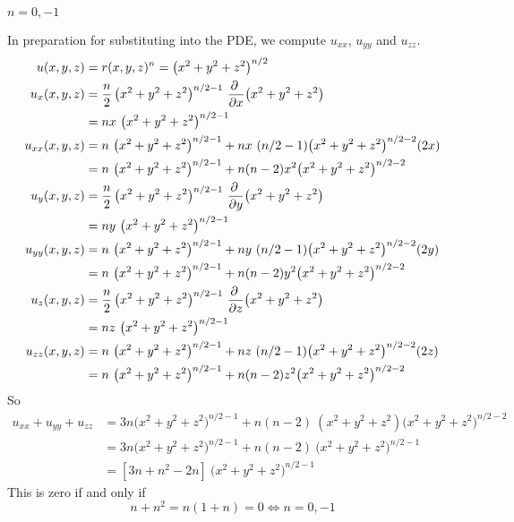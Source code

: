 %

\begin{answer}
$n=0, -1$
\end{answer}

\begin{solution}
In preparation for substituting into the PDE, we compute $u_{xx}$, $u_{yy}$ and $u_{zz}$.   
\begin{align*}
u(x,y,z) &= r(x,y,z)^n = \big(x^2+y^2+z^2\big)^{n/2}
\\
u_x(x,y,z)&= \frac{n}{2}\,\big(x^2+y^2+z^2\big)^{n/2-1}\ 
                             \pdiff{}{x}\big(x^2+y^2+z^2\big) \\
              &= nx\ \big(x^2+y^2+z^2\big)^{n/2-1}
\\
u_{xx}(x,y,z)&= n\ \big(x^2+y^2+z^2\big)^{n/2-1}
              + nx\ (n/2-1) \big(x^2+y^2+z^2\big)^{n/2-2} (2x) \\
             &=n\ \big(x^2+y^2+z^2\big)^{n/2-1}
              +n(n-2)x^2 \big(x^2+y^2+z^2\big)^{n/2-2} 
\\
u_y(x,y,z)&= \frac{n}{2}\,\big(x^2+y^2+z^2\big)^{n/2-1}\ 
                             \pdiff{}{y}\big(x^2+y^2+z^2\big) \\
              &= ny\ \big(x^2+y^2+z^2\big)^{n/2-1}
\\
u_{yy}(x,y,z)&= n\ \big(x^2+y^2+z^2\big)^{n/2-1}
              + ny\ (n/2-1) \big(x^2+y^2+z^2\big)^{n/2-2} (2y) \\
             &=n\ \big(x^2+y^2+z^2\big)^{n/2-1}
              +n(n-2)y^2 \big(x^2+y^2+z^2\big)^{n/2-2} 
\\
u_z(x,y,z)&= \frac{n}{2}\,\big(x^2+y^2+z^2\big)^{n/2-1}\ 
                             \pdiff{}{z}\big(x^2+y^2+z^2\big) \\
              &= nz\ \big(x^2+y^2+z^2\big)^{n/2-1}
\\
u_{zz}(x,y,z)&= n\ \big(x^2+y^2+z^2\big)^{n/2-1}
              + nz\ (n/2-1) \big(x^2+y^2+z^2\big)^{n/2-2} (2z) \\
             &=n\ \big(x^2+y^2+z^2\big)^{n/2-1}
              +n(n-2)z^2 \big(x^2+y^2+z^2\big)^{n/2-2} 
\end{align*}
So
\begin{align*}
u_{xx}+u_{yy}+u_{zz}
&=3n\big(x^2+y^2+z^2\big)^{n/2-1}
   +n(n-2)\ (x^2+y^2+z^2) \big(x^2+y^2+z^2\big)^{n/2-2}  \\
&=3n\big(x^2+y^2+z^2\big)^{n/2-1}
   +n(n-2)\  \big(x^2+y^2+z^2\big)^{n/2-1}  \\
&=[3n+n^2-2n]\  \big(x^2+y^2+z^2\big)^{n/2-1}
\end{align*}
This is zero if and only if
\begin{equation*}
n+n^2=n(1+n)=0
\iff n=0,-1
\end{equation*}
\end{solution}

